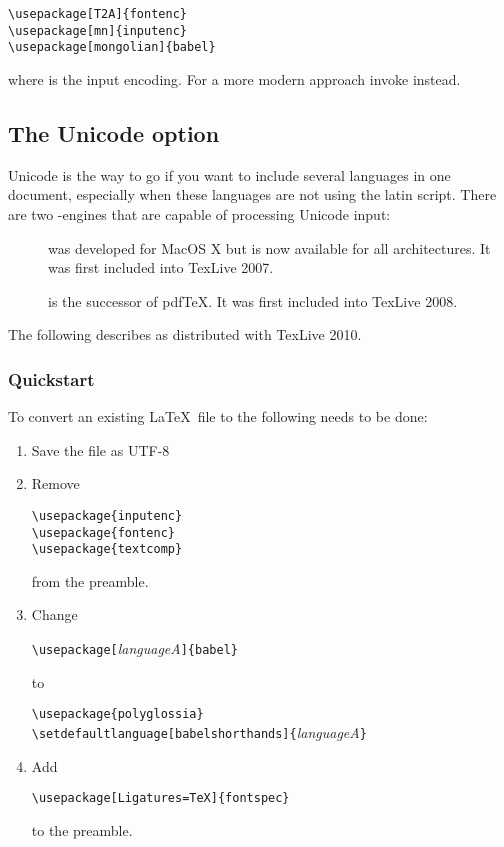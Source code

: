 \begin{lscommand}
\verb|\usepackage[T2A]{fontenc}|\\
\verb|\usepackage[mn]{inputenc}|\\
\verb|\usepackage[mongolian]{babel}|
\end{lscommand}

\noindent where  is the  input encoding. For a more modern approach
invoke  instead.

\subsection{The Unicode option}

Unicode is the way to go if you want to include several languages in one
document, especially when these languages are not using the latin script.
There are two -engines that are capable of processing Unicode
input:

\begin{description}
\item[] was developed for MacOS X but is now available for all
	architectures. It was first included into TexLive 2007.
\item[] is the successor of pdf\TeX.  It was first included
	into TexLive 2008.  
\end{description}

The following describes  as distributed with TexLive 2010.

\subsubsection{Quickstart}

To convert an existing \LaTeX\ file to  the following needs to be done:

\begin{enumerate}
\item Save the file as UTF-8
\item Remove
\begin{lscommand}
\verb|\usepackage{inputenc}|\\
\verb|\usepackage{fontenc}|\\
\verb|\usepackage{textcomp}|
\end{lscommand}
from the preamble.
\item Change
\begin{lscommand}
\verb|\usepackage[|\emph{languageA}\verb|]{babel}|
\end{lscommand}
to
\begin{lscommand}
\verb|\usepackage{polyglossia}|\\
\verb|\setdefaultlanguage[babelshorthands]{|\emph{languageA}\verb|}|
\end{lscommand}
\item Add
\begin{lscommand}
\verb|\usepackage[Ligatures=TeX]{fontspec}|
\end{lscommand}
to the preamble.
\end{enumerate}

